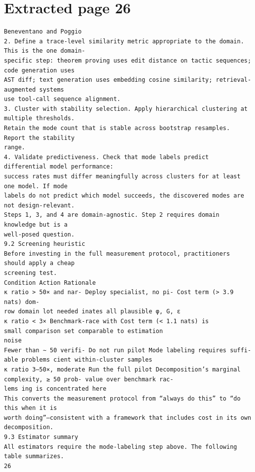 \documentclass[11pt]{article}
\begin{document}
\clearpage
\section*{Extracted page 26}
\begin{verbatim}
Beneventano and Poggio
2. Define a trace-level similarity metric appropriate to the domain. This is the one domain-
specific step: theorem proving uses edit distance on tactic sequences; code generation uses
AST diff; text generation uses embedding cosine similarity; retrieval-augmented systems
use tool-call sequence alignment.
3. Cluster with stability selection. Apply hierarchical clustering at multiple thresholds.
Retain the mode count that is stable across bootstrap resamples. Report the stability
range.
4. Validate predictiveness. Check that mode labels predict differential model performance:
success rates must differ meaningfully across clusters for at least one model. If mode
labels do not predict which model succeeds, the discovered modes are not design-relevant.
Steps 1, 3, and 4 are domain-agnostic. Step 2 requires domain knowledge but is a
well-posed question.
9.2 Screening heuristic
Before investing in the full measurement protocol, practitioners should apply a cheap
screening test.
Condition Action Rationale
κ ratio > 50× and nar- Deploy specialist, no pi- Cost term (> 3.9 nats) dom-
row domain lot needed inates all plausible φ, G, ε
κ ratio < 3× Benchmark-race with Cost term (< 1.1 nats) is
small comparison set comparable to estimation
noise
Fewer than ∼ 50 verifi- Do not run pilot Mode labeling requires suffi-
able problems cient within-cluster samples
κ ratio 3–50×, moderate Run the full pilot Decomposition’s marginal
complexity, ≥ 50 prob- value over benchmark rac-
lems ing is concentrated here
This converts the measurement protocol from “always do this” to “do this when it is
worth doing”—consistent with a framework that includes cost in its own decomposition.
9.3 Estimator summary
All estimators require the mode-labeling step above. The following table summarizes.
26
\end{verbatim}

\clearpage
\end{document}

